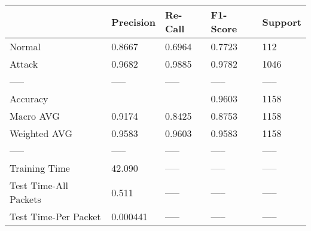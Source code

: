 \begin{tabular}{lllll}
\toprule
{} & Precision & Re-Call & F1-Score & Support \\
\midrule
Normal                &    0.8667 &  0.6964 &   0.7723 &     112 \\
Attack                &    0.9682 &  0.9885 &   0.9782 &    1046 \\
-----                 &     ----- &   ----- &    ----- &   ----- \\
Accuracy              &           &         &   0.9603 &    1158 \\
Macro AVG             &    0.9174 &  0.8425 &   0.8753 &    1158 \\
Weighted AVG          &    0.9583 &  0.9603 &   0.9583 &    1158 \\
-----                 &     ----- &   ----- &    ----- &   ----- \\
Training Time         &    42.090 &   ----- &    ----- &   ----- \\
Test Time-All Packets &     0.511 &   ----- &    ----- &   ----- \\
Test Time-Per Packet  &  0.000441 &   ----- &    ----- &   ----- \\
\bottomrule
\end{tabular}

